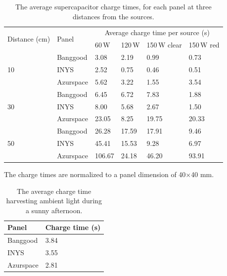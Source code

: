 \begin{table}[t]
	\centering
	\begin{threeparttable}
		\caption{The average supercapacitor charge times, for each panel at three distances from the sources.}
		\label{tab:light_results}
		\begin{tabular}{|l|l||l|l|l|l|}
			\hline
			\multirow{2}{*}{Distance (cm)} & \multirow{2}{*}{Panel} & \multicolumn{4}{c|}{Average charge time per source (s)} \\
			& & 60\,W & 120\,W & 150\,W clear & 150\,W red \\
			\hline \hline
			\multirow{3}{*}{10} & Banggood& 3.08 & 2.19 & 0.99 & 0.73 \\
			& INYS & 2.52 & 0.75 & 0.46 & 0.51 \\
			& Azurspace & 5.62 & 3.22 & 1.55 & 3.54 \\
			\hline
			\multirow{3}{*}{30} & Banggood & 6.45 & 6.72 & 7.83 & 1.88 \\
			& INYS & 8.00 & 5.68 & 2.67 & 1.50 \\
			& Azurspace & 23.05 & 8.25 & 19.75 & 20.33\\
			\hline
			\multirow{3}{*}{50} & Banggood & 26.28 & 17.59 & 17.91 & 9.46 \\
			& INYS & 45.41 & 15.53 & 9.28 & 6.97 \\
			& Azurspace & 106.67 & 24.18 & 46.20 & 93.91 \\
			\hline
		\end{tabular}
		\begin{tablenotes}
			\small
			\item The charge times are normalized to a panel dimension of 40$\times$40 mm.
		\end{tablenotes}
	\end{threeparttable}
\end{table}

\begin{table}[t]
	\centering
	\caption{The average charge time harvesting ambient light during a sunny afternoon.}
	\label{tab:solar_results}
	\begin{tabular}{|l|l|}
		\hline
		Panel & Charge time (s) \\
		\hline \hline
		Banggood & 3.84\\
		INYS & 3.55\\ 
		Azurspace & 2.81\\
		\hline
	\end{tabular}
\end{table}

